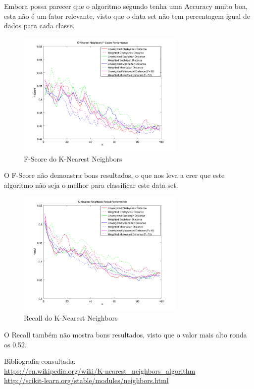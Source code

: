 \documentclass[portugues,final]{revdetua}
\begin{document}
Embora possa parecer que o algoritmo segundo tenha uma Accuracy muito boa, esta não é um fator relevante, visto que o data set não tem percentagem igual de dados para cada classe.\\

\begin{figure}[H]
\centerline{\includegraphics[width=230pt]{images/knn_graph_f-score.png}}
\caption{F-Score do K-Nearest Neighbors}
\label{img:complete}
\end{figure}

O F-Score não demonstra bons resultados, o que nos leva a crer que este algoritmo não seja o melhor para classificar este data set.\\

\begin{figure}[H]
\centerline{\includegraphics[width=230pt]{images/knn_graph_recall.png}}
\caption{Recall do K-Nearest Neighbors}
\label{img:complete}
\end{figure}

O Recall também não mostra bons resultados, visto que o valor mais alto ronda os 0.52.

Bibliografia consultada:\\
\url{https://en.wikipedia.org/wiki/K-nearest_neighbors_algorithm}\\
\url{http://scikit-learn.org/stable/modules/neighbors.html}
\end{document}

